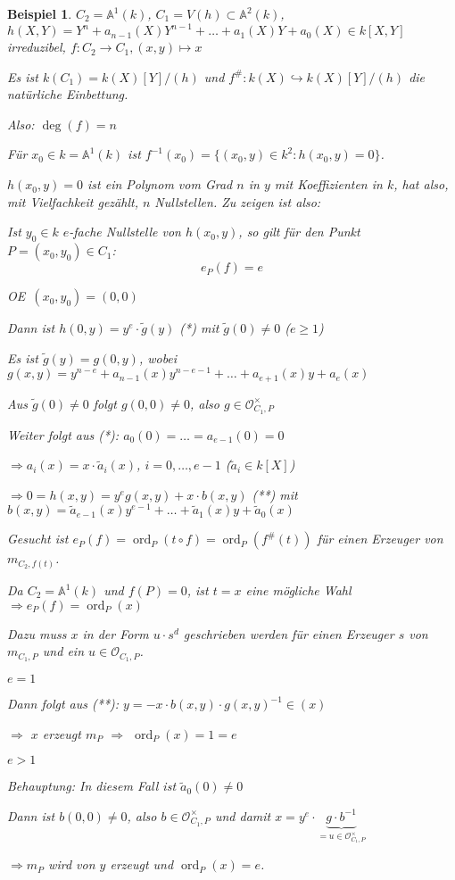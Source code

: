 \documentclass[a4paper, 12pt, numbers=noendperiod, chapterprefix=true, headsepline]{scrbook}
\theoremstyle{break}
\theoremstyle{nonumberbreak}
\newtheorem{nnBsp}{Beispiel}
\theoremstyle{nonumberplain}
\DeclareMathOperator{\ord}{ord}
\newcommand{\A}{\mathbb{A}}
\newcommand{\calO}{\mathcal{O}}
\newcommand{\X}{\times}
\renewcommand{\OE}{O\!\!E~}
\begin{document}
\begin{nnBsp}
$C_2=\A^1(k)$, $C_1=V(h)\subset \A^2(k)$, $h(X,Y)=Y^n+a_{n-1}(X)Y^{n-1}+\ldots +a_1(X)Y+a_0(X) \in k[X,Y]$ irreduzibel, $f:C_2 \to C_1, (x,y) \mapsto x$

Es ist $k(C_1) = k(X)[Y]/(h)$ und $f^\#: k(X) \hookrightarrow k(X)[Y]/(h)$ die nat\"urliche Einbettung.

Also: $\deg(f) = n$

F\"ur $x_0 \in k =\A^1(k)$ ist $f^{-1}(x_0) = \{ (x_0,y) \in k^2: h(x_0,y)=0\}$.

$h(x_0,y)=0$ ist ein Polynom vom Grad $n$ in $y$ mit Koeffizienten in $k$, hat also, mit Vielfachkeit gez\"ahlt, $n$ Nullstellen. Zu zeigen ist also:
\begin{description}[\setlabelstyle{\itshape}]
\item[Behauptung:]
	Ist $y_0 \in k$ $e$-fache Nullstelle von $h(x_0,y)$, so gilt f\"ur den Punkt $P = (x_0,y_0) \in C_1$: \[e_P(f)=e\]
\item[Beweis:]
	\OE $(x_0, y_0) = (0,0)$
	
	Dann ist $h(0,y) = y^e\cdot \tilde{g}(y)$ (*) mit $\tilde{g}(0) \ne 0$ ($e \ge 1$)
	
	Es ist $\tilde{g}(y) = g(0,y)$, wobei $g(x,y) = y^{n-e} + a_{n-1}(x)y^{n-e-1} + \ldots + a_{e+1}(x)y + a_e(x)$
	
	Aus $\tilde{g}(0) \ne 0$ folgt $g(0,0) \ne 0$, also $g \in \calO_{C_1, P}^\X$
	
	Weiter folgt aus (*): $a_0(0) = \ldots = a_{e-1}(0) = 0$
	
	$\Rightarrow a_i(x) = x \cdot \tilde{a}_i(x)$, $i=0,\ldots ,e-1$ ($\tilde{a}_i \in k[X]$)
	
	$\Rightarrow 0=h(x,y) = y^e g(x,y) + x \cdot b(x,y)$ (**) mit $b(x,y) = \tilde{a}_{e-1}(x)y^{e-1} + \ldots  + \tilde{a}_1(x)y + \tilde{a}_0(x)$
	
	Gesucht ist $e_P(f) = \ord_P(t \circ f) = \ord_P(f^\#(t))$ f\"ur einen Erzeuger von $m_{C_2,f(t)}$.
	
	Da $C_2 = \A^1(k)$ und $f(P) = 0$, ist $t=x$ eine m\"ogliche Wahl $\Rightarrow e_P(f) = \ord_P(x)$
	
	Dazu muss $x$ in der Form $u\cdot s^d$ geschrieben werden f\"ur einen Erzeuger $s$ von $m_{C_1,P}$ und ein $u \in \calO_{C_1,P}$.
	\begin{description}[\setlabelstyle{\itshape}]
		\item[1. Fall:] $e=1$
		
			Dann folgt aus (**):	$y = -x \cdot b(x,y) \cdot g(x,y)^{-1} \in (x)$
			
			$\Rightarrow$ $x$ erzeugt $m_P$ $\Rightarrow$ $\ord_P(x) = 1 = e$
		\item[2. Fall:] $e > 1$
		
			\emph{Behauptung:} In diesem Fall ist $\tilde{a}_0(0) \ne 0$
			
			Dann ist $b(0,0) \ne 0$, also $b \in \calO_{C_1,P}^\X$ und damit $x= y^e \cdot \underbrace{g \cdot b^{-1}}_{=u \in \calO_{C_1,P}^\X}$
			
			$\Rightarrow m_P$ wird von $y$ erzeugt und $\ord_P(x) = e$.
	\end{description}
\end{description}\end{nnBsp}
\end{document}
